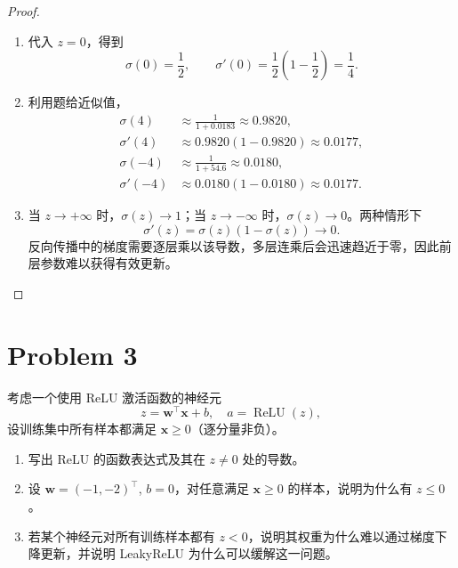 \begin{proof}
    \begin{enumerate}
        \item 代入 $z=0$，得到
        \[
            \sigma(0)=\frac12,\qquad
            \sigma'(0)=\frac12\left(1-\frac12\right)=\boxed{\frac14}.
        \]
        \item 利用题给近似值，
        \[
        \begin{aligned}
            \sigma(4)
            &\approx \frac{1}{1+0.0183}
             \approx 0.9820, \\
            \sigma'(4)
            &\approx 0.9820(1-0.9820)
             \approx 0.0177, \\
            \sigma(-4)
            &\approx \frac{1}{1+54.6}
             \approx 0.0180, \\
            \sigma'(-4)
            &\approx 0.0180(1-0.0180)
             \approx 0.0177.
        \end{aligned}
        \]
        \item 当 $z\to+\infty$ 时，$\sigma(z)\to1$；当 $z\to-\infty$ 时，$\sigma(z)\to0$。两种情形下
        \[
            \sigma'(z)=\sigma(z)(1-\sigma(z))\to0.
        \]
        反向传播中的梯度需要逐层乘以该导数，多层连乘后会迅速趋近于零，因此前层参数难以获得有效更新。
    \end{enumerate}
\end{proof}

\section*{Problem 3}

考虑一个使用 ReLU 激活函数的神经元
\[
z = \bm{w}^\top \bm{x} + b,\quad a = \operatorname{ReLU}(z),
\]
设训练集中所有样本都满足 $\bm{x} \ge 0$（逐分量非负）。
\begin{enumerate}
    \item 写出 ReLU 的函数表达式及其在 $z \neq 0$ 处的导数。
    \item 设 $\bm{w} = (-1, -2)^\top$, $b = 0$，对任意满足 $\bm{x} \ge 0$ 的样本，说明为什么有 $z \le 0$。
    \item 若某个神经元对所有训练样本都有 $z < 0$，说明其权重为什么难以通过梯度下降更新，并说明 LeakyReLU 为什么可以缓解这一问题。
\end{enumerate}

